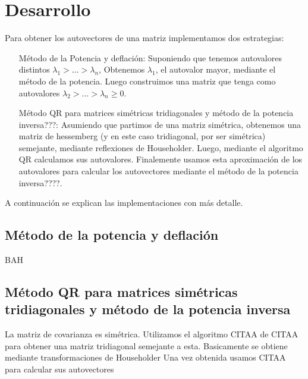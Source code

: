 \section{Desarrollo}

\PARstart Para obtener los autovectores de una matriz implementamos
dos estrategias:

\begin{itemize}
	\item[M\'etodo de la Potencia y deflaci\'on:] Suponiendo que
	tenemos autovalores distintos $\lambda_1 > \ldots > \lambda_n$,
	Obtenemos $\lambda_1$, el autovalor mayor, mediante
	el m\'etodo de la potencia. Luego construimos una matriz que tenga
	como autovalores $\lambda_2 > \ldots > \lambda_n \geq 0$.

	\item[M\'etodo QR para matrices sim\'etricas tridiagonales y m\'etodo
	de la potencia inversa???:] Asumiendo que partimos de una matriz
	sim\'etrica, obtenemos una matriz de hessemberg (y en este caso
	tridiagonal, por ser sim\'etrica) semejante, mediante reflexiones de
	Householder. Luego, mediante el algoritmo QR calculamos sus
	autovalores. Finalemente usamos esta aproximaci\'on de
	los autovalores para calcular los autovectores mediante el m\'etodo
	de la potencia inversa????.
\end{itemize}

A continuaci\'on se explican las implementaciones con m\'as detalle.

\subsection{M\'etodo de la potencia y deflaci\'on}
BAH

\subsection{M\'etodo QR para matrices sim\'etricas tridiagonales y m\'etodo
de la potencia inversa}

La matriz de covarianza es sim\'etrica. Utilizamos el algoritmo CITAA de CITAA
para obtener una matriz tridiagonal semejante a esta. Basicamente se obtiene
mediante transformaciones de Householder
Una vez obtenida usamos CITAA para calcular sus autovectores
